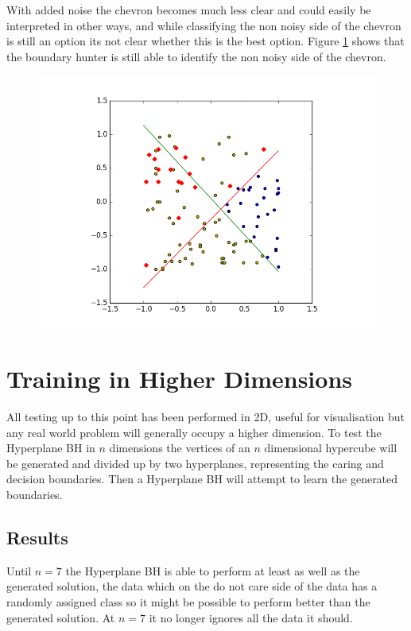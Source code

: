 \documentclass[notitlepage]{report}
\theoremstyle{definition}
\begin{document}
With added noise the chevron becomes much less clear and could easily be interpreted in other ways, and while classifying the non noisy side of the chevron is still an option its not clear whether this is the best option. Figure \ref{fig:noisyChev-BH-withbias} shows that the boundary hunter is still able to identify the non noisy side of the chevron.

\begin{figure}[H]
  \centering
  \begin{minipage}[b]{0.8\textwidth}
    \includegraphics[width=\textwidth]{NoisyChev-BH-WithByas.png}
    \caption{}
    \label{fig:noisyChev-BH-withbias}
  \end{minipage}
  \hfill
\end{figure}
\chapter{Training in Higher Dimensions}
All testing up to this point has been performed in 2D, useful for visualisation but any real world problem will generally occupy a higher dimension. To test the Hyperplane BH in $n$ dimensions the vertices of an $n$ dimensional hypercube will be generated and divided up by two hyperplanes, representing the caring and decision boundaries. Then a Hyperplane BH will attempt to learn the generated boundaries.

\section{Results}
Until $n = 7$ the Hyperplane BH is able to perform at least as well as the generated solution, the data which on the do not care side of the data has a randomly assigned class so it might be possible to perform better than the generated solution. At $n = 7$ it no longer ignores all the data it should.\\
\end{document}
